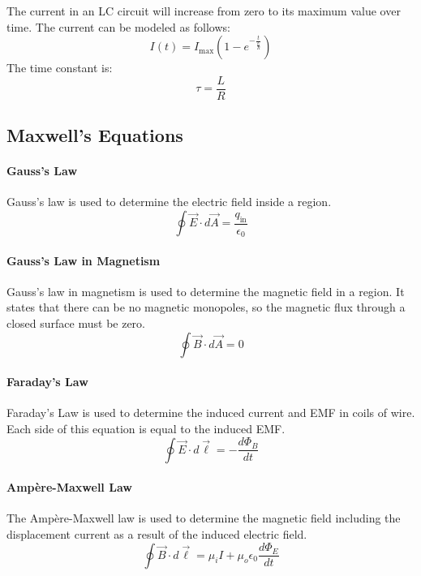 \documentclass{article}
\begin{document}
            The current in an LC circuit will increase from zero to its maximum value over time. The current can be modeled as follows:
            \begin{equation}
                I(t) = I_\text{max} \left( 1 - e^{- \frac{t}{\frac{L}{R}}} \right)
            \end{equation}
            The time constant is:
            \begin{equation}
                \tau = \frac{L}{R}
            \end{equation}

        \subsection{Maxwell's Equations}
            \paragraph{Gauss's Law}
            Gauss's law is used to determine the electric field inside a region.
            \begin{equation}
                \oint \vec{E} \cdot d\vec{A} = \frac{q_\text{in}}{\epsilon_0}
            \end{equation}

            \paragraph{Gauss's Law in Magnetism}
            Gauss's law in magnetism is used to determine the magnetic field in a region. It states that there can be no magnetic monopoles, so the magnetic flux through a closed surface must be zero.
            \begin{equation}
                \oint \vec{B} \cdot d\vec{A} = 0
            \end{equation}

            \paragraph{Faraday's Law}
            Faraday's Law is used to determine the induced current and EMF in coils of wire. Each side of this equation is equal to the induced EMF.
            \begin{equation}
                \oint \vec{E} \cdot d\vec{\ell} = - \frac{d\Phi_B}{dt}
            \end{equation}

            \paragraph{Amp\`{e}re-Maxwell Law}
            The Amp\`{e}re-Maxwell law is used to determine the magnetic field including the displacement current as a result of the induced electric field.
            \begin{equation}
                \oint \vec{B} \cdot d\vec{\ell} = \mu_i I + \mu_o \epsilon_0 \frac{d\Phi_E}{dt}
            \end{equation}
\end{document}
